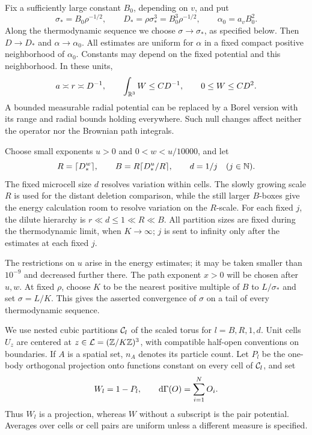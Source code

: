 Fix a sufficiently large constant $B_0$, depending on $v$, and put
\begin{equation}\label{eq:physical-base-scale}
 \sigma_*=B_0\rho^{-1/2},\qquad
 D_*=\rho\sigma_*^3=B_0^3\rho^{-1/2},\qquad
 \alpha_0=a_vB_0^2.
\end{equation}
Along the thermodynamic sequence we choose $\sigma\to\sigma_*$, as
specified below. Then $D\to D_*$ and $\alpha\to\alpha_0$. All estimates
are uniform for $\alpha$ in a fixed compact positive neighborhood of
$\alpha_0$. Constants may depend on the fixed potential and this
neighborhood. In these units,
\begin{equation}\label{eq:potential-scales}
 a\asymp r\asymp D^{-1},\qquad
 \int_{\mathbb R^3}W\le C D^{-1},\qquad 0\le W\le C D^2.
\end{equation}
A bounded measurable radial potential can be replaced by a Borel version
with its range and radial bounds holding everywhere. Such null changes
affect neither the operator nor the Brownian path integrals.

Choose small exponents $u>0$ and $0<w<u/10000$, and let
\begin{equation}\label{eq:partition-scales}
 R=\lceil D_*^w\rceil,\qquad
 B=R\lceil D_*^u/R\rceil,\qquad d=1/j\quad(j\in\mathbb N).
\end{equation}
The fixed microcell size $d$ resolves variation within cells.  The
slowly growing scale $R$ is used for the distant deletion comparison,
while the still larger $B$-boxes give the energy calculation room to
resolve variation on the $R$-scale.  For each fixed $j$, the dilute
hierarchy is $r\ll d\le1\ll R\ll B$.  All partition sizes are fixed
during the thermodynamic limit, when $K\to\infty$; $j$ is sent to
infinity only after the estimates at each fixed $j$.

The restrictions on $u$ arise in the energy estimates; it may be taken
smaller than $10^{-9}$ and decreased further there. The path exponent
$x>0$ will be chosen after $u,w$. At fixed $\rho$, choose $K$ to be the
nearest positive multiple of $B$ to $L/\sigma_*$ and set $\sigma=L/K$.
This gives the asserted convergence of $\sigma$ on a tail of every
thermodynamic sequence.

We use nested cubic partitions $\mathcal C_l$ of the scaled torus for
$l=B,R,1,d$. Unit cells $U_z$ are centered at
$z\in\mathcal L=(\mathbb Z/K\mathbb Z)^3$, with compatible half-open conventions on
boundaries. If $A$ is a spatial set, $n_A$ denotes its particle count.
Let $P_l$ be the one-body orthogonal projection onto functions constant
on every cell of $\mathcal C_l$, and set
\begin{equation}\label{eq:cell-projections}
 W_l=1-P_l,\qquad \mathrm d\Gamma(O)=\sum_{i=1}^N O_i.
\end{equation}
Thus $W_l$ is a projection, whereas $W$ without a subscript is the pair
potential. Averages over cells or cell pairs are uniform unless a
different measure is specified.

